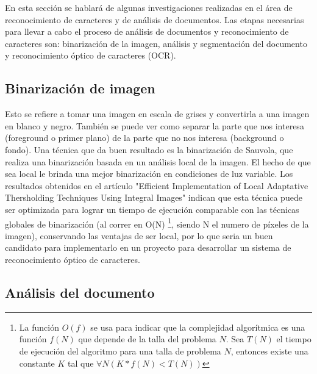 \documentclass[a4paper, 11pt, oneside]{report}
\begin{document}
En esta sección se hablará de algunas investigaciones realizadas en el área de reconocimiento de caracteres y de análisis de documentos. Las etapas necesarias para llevar a cabo el proceso de análisis de documentos y reconocimiento de caracteres son: binarización de la imagen, análisis y segmentación del documento y reconocimiento óptico de caracteres (OCR).  

\subsection{Binarización de imagen}

Esto se refiere a tomar una imagen en escala de grises y convertirla a una  imagen en blanco y negro. También se puede ver como separar la parte que nos interesa (foreground o primer plano) de la parte que no nos interesa (background o fondo). Una técnica que da buen resultado es la binarización de Sauvola, que realiza una binarización basada en un análisis local de la imagen. El hecho de que sea local le brinda una mejor binarización en condiciones de luz variable. Los  resultados obtenidos en el artículo "Efficient Implementation of Local Adaptative  Thersholding Techniques Using Integral Images" indican que esta técnica puede ser optimizada para lograr un tiempo de ejecución comparable con las técnicas globales de  binarización (al correr en O(N) \footnote{La función $O(f)$ se usa para indicar que la complejidad algorítmica es una función $f(N)$ que depende de la talla del problema $N$. Sea $T(N)$ el tiempo de  ejecución del algoritmo para una talla de problema $N$, entonces existe una constante $K$ tal que  $\forall N ( K*f(N) < T(N) ) $}, siendo N el numero de píxeles de la imagen), conservando	las ventajas de ser local, por lo que seria un buen candidato para implementarlo en un  proyecto para desarrollar un sistema de reconocimiento óptico de caracteres.

\subsection{Análisis del documento}
\end{document}
